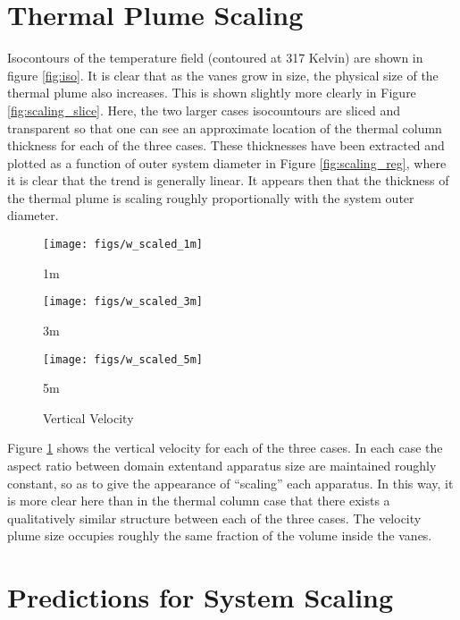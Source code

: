 \documentclass[english]{article}
\begin{document}
\section*{Thermal Plume Scaling}

Isocontours of the temperature field (contoured at 317 Kelvin) are 
shown in figure \ref{fig:iso}. 
It is clear that as the vanes grow in size, the physical size of the
thermal plume also increases. This is shown slightly more clearly in
Figure \ref{fig:scaling_slice}. Here, the two larger cases isocountours
are sliced and transparent so that one can see an approximate location
of the thermal column thickness for each of the three cases. These
thicknesses have been extracted and plotted as a function of outer
system diameter in Figure \ref{fig:scaling_reg}, where it is clear that
the trend is generally linear. It appears then that the thickness of the
thermal plume is scaling roughly proportionally with the system outer
diameter.  

%
%


\begin{figure}[!htb]
\texttt{[image: figs/w\_scaled\_1m]}
\caption*{1m}\label{fig:1m_vz}
\endminipage\hfill
{}
\texttt{[image: figs/w\_scaled\_3m]}
\caption*{3m}\label{fig:3m_vz}
\endminipage\hfill
{}%
\texttt{[image: figs/w\_scaled\_5m]}
  \caption*{5m}\label{fig:5m_vz}
\endminipage
\caption{Vertical Velocity}
\label{fig:vz_scaling}
\end{figure}
 
Figure \ref{fig:vz_scaling} shows the vertical velocity for each of the
three cases. In each case the aspect ratio between domain extentand
apparatus size are maintained roughly constant, so as to give the
appearance of ``scaling'' each apparatus. In this way, it is more clear
here than in the thermal column case that there exists a qualitatively
similar structure between each of the three cases. The velocity plume
size occupies roughly the same fraction of the volume inside the vanes.  

%
%
%
\section*{Predictions for System Scaling}

\end{document}
